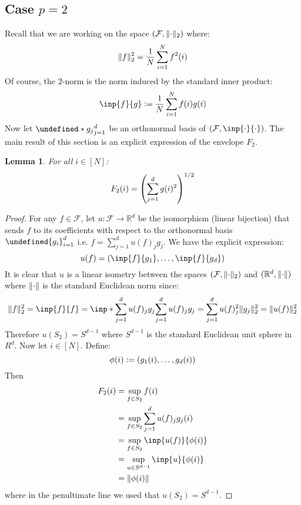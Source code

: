 \documentclass{article}
\theoremstyle{plain}
\newtheorem{lemma}{Lemma}
\theoremstyle{definition}
\theoremstyle{remark}
\newcommand{\defeq}{\vcentcolon=}
\let\brace\undefined
\DeclarePairedDelimiter{\brace}{\lbrace}{\rbrace}
\DeclarePairedDelimiter{\paren}{\lparen}{\rparen}
\newcommand{\R}{\mathbb{R}}
\DeclarePairedDelimiter{\norm}{\lVert}{\rVert}
\begin{document}
\subsection{Case $p=2$}
Recall that we are working on the space $(\mathcal{F}, \norm{\cdot}_2)$ where:
\begin{equation*}
    \norm{f}_2^2 = \frac{1}{N} \sum_{i=1}^{N} f^2(i)
\end{equation*}
Of course, the $2$-norm is the norm induced by the standard inner product:
\begin{equation*}
    \inp{f}{g} \defeq \frac{1}{N} \sum_{i=1}^{N} f(i)g(i)
\end{equation*}
Now let $\brace*{g_j}_{j=1}^{d}$ be an orthonormal basis of $(\mathcal{F}, \inp{\cdot}{\cdot})$. The main result of this section is an explicit expression of the envelope $F_2$.
\begin{lemma}
\label{lem:2}
For all $i \in [N]$:
    \begin{equation*}
        F_2(i) = \paren*{\sum_{j=1}^{d} g(i)^2}^{1/2}
    \end{equation*}
\end{lemma}
\begin{proof}
    For any $f \in \mathcal{F}$, let $u: \mathcal{F} \to \R^{d}$ be the isomorphism (linear bijection) that sends $f$ to its coefficients with respect to the orthonormal basis $\brace{g_i}_{i=1}^{d}$ i.e. $f = \sum_{j=1}^{d}u(f)_j g_j$. We have the explicit expression:
    \begin{equation*}
        u(f) = \paren*{\inp{f}{g_1}, \dotsc, \inp{f}{g_d}}
    \end{equation*}
    It is clear that $u$ is a linear isometry between the spaces $(\mathcal{F}, \norm{\cdot}_2)$ and $(\R^d, \norm{\cdot})$ where $\norm{\cdot}$ is the standard Euclidean norm since:
    \begin{equation*}
        \norm{f}_2^2 = \inp{f}{f} = \inp*{\sum_{j=1}^{d} u(f)_j g_j}{\sum_{j=1}^{d} u(f)_j g_j} = \sum_{j=1}^{d} u(f)_j^2 \norm{g_j}_2^2 = \norm{u(f)}_2^2
    \end{equation*}
    Therefore $u(S_2) = S^{d-1}$ where $S^{d-1}$ is the standard Euclidean unit sphere in $R^{d}$.
    Now let $i \in [N]$. Define:
    \begin{equation*}
        \phi(i) \defeq \paren*{g_1(i), \dotsc, g_d(i)}
    \end{equation*}
    Then
    \begin{align*}
        F_2(i) &= \sup_{f \in S_2} f(i) \\
        &= \sup_{f \in S_2} \sum_{j=1}^{d} u(f)_j g_j(i) \\
        &= \sup_{f \in S_2} \inp{u(f)}{\phi(i)} \\
        &= \sup_{u \in S^{d-1}} \inp{u}{\phi(i)} \\
        &= \norm{\phi(i)}
    \end{align*}
    where in the penultimate line we used that $u(S_2) = S^{d-1}$.
\end{proof}
\end{document}
